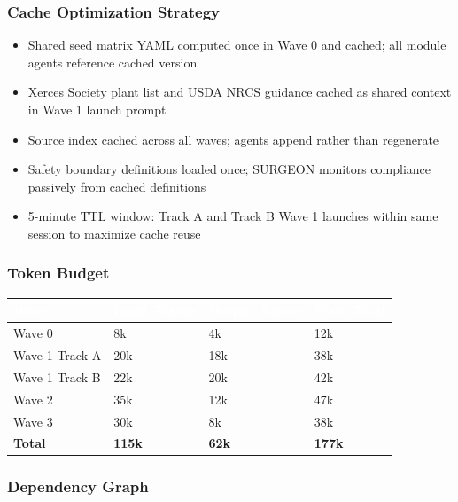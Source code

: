 \documentclass[11pt,letterpaper]{article}
\newcommand{\tableheader}[1]{\textbf{\sffamily\textcolor{white}{#1}}}
\begin{document}
\subsubsection{Cache Optimization Strategy}
\begin{itemize}[leftmargin=1.5em]
  \item Shared seed matrix YAML computed once in Wave 0 and cached; all module agents reference cached version
  \item Xerces Society plant list and USDA NRCS guidance cached as shared context in Wave 1 launch prompt
  \item Source index cached across all waves; agents append rather than regenerate
  \item Safety boundary definitions loaded once; SURGEON monitors compliance passively from cached definitions
  \item 5-minute TTL window: Track A and Track B Wave 1 launches within same session to maximize cache reuse
\end{itemize}

\subsubsection{Token Budget}

\begin{center}
\begin{tabularx}{\textwidth}{L{3cm}C{2.5cm}C{2.5cm}C{2.5cm}}
\toprule
{}
\tableheader{Wave} & \tableheader{Input Tokens} & \tableheader{Output Tokens} & \tableheader{Wave Total} \\
\midrule
Wave 0 & 8k & 4k & 12k \\
Wave 1 Track A & 20k & 18k & 38k \\
Wave 1 Track B & 22k & 20k & 42k \\
Wave 2 & 35k & 12k & 47k \\
Wave 3 & 30k & 8k & 38k \\
\midrule
{}
\textbf{Total} & \textbf{115k} & \textbf{62k} & \textbf{177k} \\
\bottomrule
\end{tabularx}
\end{center}

\subsubsection{Dependency Graph}
\end{document}
